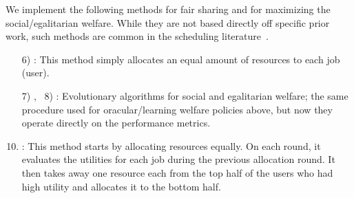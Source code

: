 We implement the following methods for fair sharing and for
maximizing the social/egalitarian welfare.
While they are not based directly off specific prior work, such methods are common in the
scheduling literature~\citep{crankshaw2017clipper,grandl2016altruistic}.
\vspace{-0.02in}
\begin{itemize}[label=\arabic*)]

\item[6)] \equalshare: 
This method simply allocates an equal amount of resources to each job (user).
\vspace{-0.05in}

\item[7)] \evoalgsw, \, 8)  \evoalgew:
Evolutionary algorithms for social and egalitarian welfare;
the same procedure used for oracular/learning welfare policies above, but
now they operate directly on the performance metrics.
\end{itemize}
\begin{enumerate}[label=\arabic*)]
\setcounter{enumi}{9}
\item \greedyew: 
This method starts by allocating resources equally.
On each round,
it evaluates the utilities for each job during the previous allocation round.
It then takes away one resource each from the top half of the users who had high utility 
and allocates it to the bottom half.
\end{enumerate}


